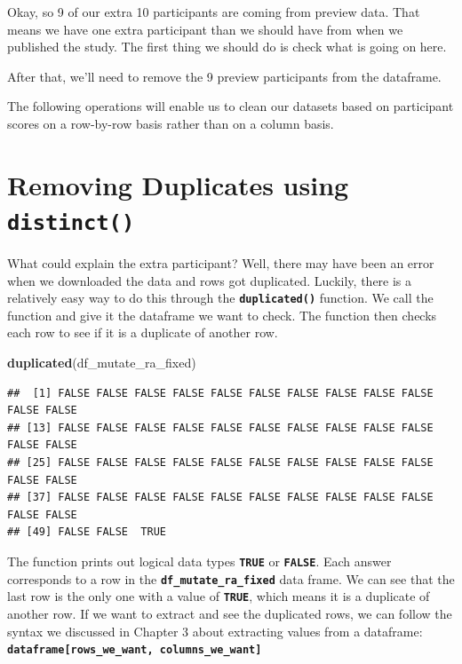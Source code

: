 \documentclass[
]{book}
\newenvironment{Shaded}{\begin{snugshade}}{\end{snugshade}}
\newcommand{\FunctionTok}[1]{\textcolor[rgb]{0.13,0.29,0.53}{\textbf{#1}}}
\newcommand{\NormalTok}[1]{#1}
\begin{document}
Okay, so 9 of our extra 10 participants are coming from preview data. That means we have one extra participant than we should have from when we published the study. The first thing we should do is check what is going on here.

After that, we'll need to remove the 9 preview participants from the dataframe.

The following operations will enable us to clean our datasets based on participant scores on a row-by-row basis rather than on a column basis.

\section{\texorpdfstring{Removing Duplicates using \texttt{distinct()}}{Removing Duplicates using distinct()}}\label{removing-duplicates-using-distinct}

What could explain the extra participant? Well, there may have been an error when we downloaded the data and rows got duplicated. Luckily, there is a relatively easy way to do this through the \textbf{\texttt{duplicated()}} function. We call the function and give it the dataframe we want to check. The function then checks each row to see if it is a duplicate of another row.

\begin{Shaded}
\begin{Highlighting}[]
\FunctionTok{duplicated}\NormalTok{(df\_mutate\_ra\_fixed)}
\end{Highlighting}
\end{Shaded}

\begin{verbatim}
##  [1] FALSE FALSE FALSE FALSE FALSE FALSE FALSE FALSE FALSE FALSE FALSE FALSE
## [13] FALSE FALSE FALSE FALSE FALSE FALSE FALSE FALSE FALSE FALSE FALSE FALSE
## [25] FALSE FALSE FALSE FALSE FALSE FALSE FALSE FALSE FALSE FALSE FALSE FALSE
## [37] FALSE FALSE FALSE FALSE FALSE FALSE FALSE FALSE FALSE FALSE FALSE FALSE
## [49] FALSE FALSE  TRUE
\end{verbatim}

The function prints out logical data types \textbf{\texttt{TRUE}} or \textbf{\texttt{FALSE}}. Each answer corresponds to a row in the \textbf{\texttt{df\_mutate\_ra\_fixed}} data frame. We can see that the last row is the only one with a value of \textbf{\texttt{TRUE}}, which means it is a duplicate of another row. If we want to extract and see the duplicated rows, we can follow the syntax we discussed in Chapter 3 about extracting values from a dataframe: \textbf{\texttt{dataframe{[}rows\_we\_want,\ columns\_we\_want{]}}}
\end{document}
